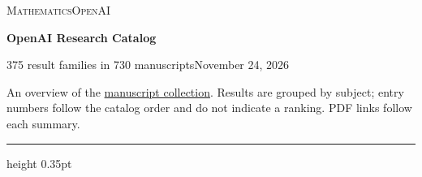 \documentclass[11pt,a4paper]{article}
\begin{document}
\thispagestyle{firstpage}
{\small\scshape Mathematics\hfill OpenAI\par}
\vspace{5pt}
{\LARGE\bfseries OpenAI Research Catalog\par}
\vspace{4pt}
{\small 375 result families in 730 manuscripts\hfill November 24, 2026\par}
\vspace{7pt}
{\small An overview of the \href{https://github.com/openai/math}{manuscript collection}. Results are grouped by subject; entry numbers follow the catalog order and do not indicate a ranking. PDF links follow each summary.\par}
\vspace{8pt}\hrule height 0.35pt\vspace{5pt}
\end{document}
